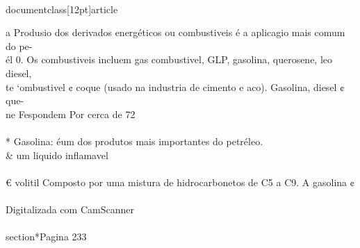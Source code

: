 \\documentclass[12pt]{article}
\begin{document}
a Produsio dos derivados energéticos ou combustiveis é a aplicagio mais comum do pe-\\
él 0. Os combustiveis incluem gas combustivel, GLP, gasolina, querosene, leo diesel,\\
te ‘ombustivel ¢ coque (usado na industria de cimento e aco). Gasolina, diesel ¢ que-\\
ne Fespondem Por cerca de 72\\%
\\
* Gasolina: éum dos produtos mais importantes do petréleo. \\& um liquido inflamavel\\
\\
€ volitil Composto por uma mistura de hidrocarbonetos de C5 a C9. A gasolina ¢\\
\\
Digitalizada com CamScanner\\

\\section*{Pagina 233}
\end{document}
